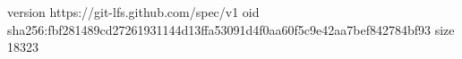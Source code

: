 version https://git-lfs.github.com/spec/v1
oid sha256:fbf281489cd27261931144d13ffa53091d4f0aa60f5c9e42aa7bef842784bf93
size 18323
